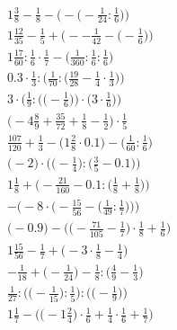 \documentclass[8pt]{article}
\begin{document}
\begin{align}
1\frac{3}{8} - \frac{1}{8} - \Big(-\big(-\frac{1}{24} : \frac{1}{6}\big)\Big) \\
1\frac{12}{35} - \frac{1}{5} + \Big(--\frac{1}{42} - \big(-\frac{1}{6}\big)\Big) \\
1\frac{17}{60} : \frac{1}{6} \cdot \frac{1}{7} - \big(\frac{1}{360} : \frac{1}{6} : \frac{1}{6}\big) \\
0.3 \cdot \frac{1}{3} : \Big(\frac{1}{70} : \big(\frac{19}{28} - \frac{1}{4} \cdot \frac{1}{3}\big)\Big) \\
3 \cdot \bigg(\frac{1}{9} : \Big(\big(-\frac{1}{6}\big)\Big) \cdot \Big(3 \cdot \frac{1}{6}\Big)\bigg) \\
\big(-4\frac{8}{9} + \frac{35}{72} + \frac{1}{8} - \frac{1}{2}\big) \cdot \frac{1}{5} \\
\frac{107}{120} + \frac{1}{3} - \big(1\frac{2}{8} \cdot 0.1\big) - \big(\frac{1}{60} : \frac{1}{6}\big) \\
\Big(-2\Big) \cdot \Big(\big(-\frac{1}{4}\big) : \big(\frac{3}{5} - 0.1\big)\Big) \\
1\frac{1}{8} + \Big(-\frac{21}{160} - 0.1 : \big(\frac{1}{8} + \frac{1}{8}\big)\Big) \\
-\bigg(-8 \cdot \Big(-\frac{15}{56} - \big(\frac{1}{49} : \frac{1}{7}\big)\Big)\bigg) \\
\Big(-0.9\Big) - \Big(\big(-\frac{71}{105} - \frac{1}{7}\big) \cdot \frac{1}{8} + \frac{1}{6}\Big) \\
1\frac{15}{56} - \frac{1}{7} + \big(-3 \cdot \frac{1}{8} - \frac{1}{4}\big) \\
-\frac{1}{18} + \big(-\frac{1}{24}\big) - \frac{1}{8} : \big(\frac{4}{9} - \frac{1}{3}\big) \\
\frac{1}{27} : \Big(\big(-\frac{1}{15}\big) : \frac{1}{5}\Big) : \Big(\big(-\frac{1}{9}\big)\Big) \\
1\frac{1}{7} - \Big(\big(-1\frac{2}{4}\big) \cdot \frac{1}{6} + \frac{1}{4} \cdot \frac{1}{6} + \frac{1}{7}\Big)
\end{align}
\end{document}
